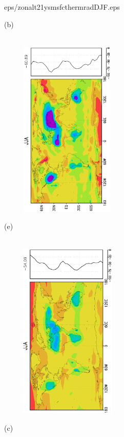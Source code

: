 \documentclass[12pt,a4paper,twoside,openright,headinclude,liststotoc,bibtotoc]{scrreprt}
\begin{document}
\begin{figure}[H]
{{eps/zonalt21ysmsfcthermradDJF.eps}
}
\parbox{8.5cm}{\hspace{0.50cm}\begin{scriptsize}(b)\end{scriptsize} \vspace{-0.7cm} \\
\includegraphics[height=8.5cm,width=6.5cm,angle=-90]
{eps/zonalysmsfcthermrad177JJA.eps}
}
\parbox{8.5cm}{\hspace{0.28cm}\begin{scriptsize}(e)\end{scriptsize} \vspace{-0.7cm} \\
\includegraphics[height=8.5cm,width=6.5cm,angle=-90]
{eps/zonalt21ysmsfcthermradJJA.eps}
}
\parbox{8.5cm}{\hspace{0.50cm}\begin{scriptsize}(c)\end{scriptsize} \vspace{-0.7cm} \\
}
\end{figure}
\end{document}
